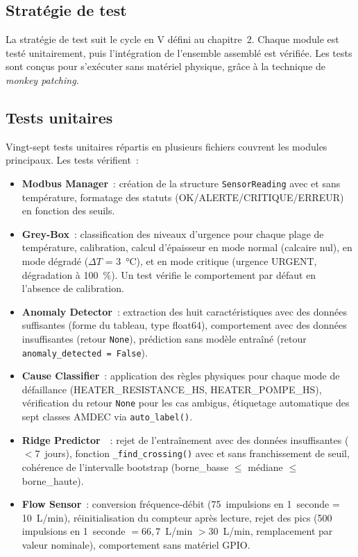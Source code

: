 \subsection{Stratégie de test}

La stratégie de test suit le cycle en V défini au chapitre~2. Chaque module est testé unitairement, puis l'intégration de l'ensemble assemblé est vérifiée. Les tests sont conçus pour s'exécuter sans matériel physique, grâce à la technique de \textit{monkey patching}.

\subsection{Tests unitaires}

Vingt-sept tests unitaires répartis en plusieurs fichiers couvrent les modules principaux. Les tests vérifient~:

\begin{itemize}
  \item \textbf{Modbus Manager}~: création de la structure \texttt{SensorReading} avec et sans température, formatage des statuts (OK/ALERTE/CRITIQUE/ERREUR) en fonction des seuils.
  \item \textbf{Grey-Box}~: classification des niveaux d'urgence pour chaque plage de température, calibration, calcul d'épaisseur en mode normal (calcaire nul), en mode dégradé (\(\Delta T\) = 3~\si{\celsius}), et en mode critique (urgence URGENT, dégradation à 100~\%). Un test vérifie le comportement par défaut en l'absence de calibration.
  \item \textbf{Anomaly Detector}~: extraction des huit caractéristiques avec des données suffisantes (forme du tableau, type float64), comportement avec des données insuffisantes (retour \texttt{None}), prédiction sans modèle entraîné (retour \texttt{anomaly\_detected = False}).
  \item \textbf{Cause Classifier}~: application des règles physiques pour chaque mode de défaillance (HEATER\_RESISTANCE\_HS, HEATER\_POMPE\_HS), vérification du retour \texttt{None} pour les cas ambigus, étiquetage automatique des sept classes AMDEC via \texttt{auto\_label()}.
  \item \textbf{Ridge Predictor}~~: rejet de l'entraînement avec des données insuffisantes (\(<7\)~jours), fonction \texttt{\_find\_crossing()} avec et sans franchissement de seuil, cohérence de l'intervalle bootstrap (borne\_basse \(\leq\) médiane \(\leq\) borne\_haute).
  \item \textbf{Flow Sensor}~: conversion fréquence-débit (75~impulsions en 1~seconde = 10~L/min), réinitialisation du compteur après lecture, rejet des pics (500 impulsions en 1~seconde \(= 66,7\)~L/min \(>30\)~L/min, remplacement par valeur nominale), comportement sans matériel GPIO.
\end{itemize}

